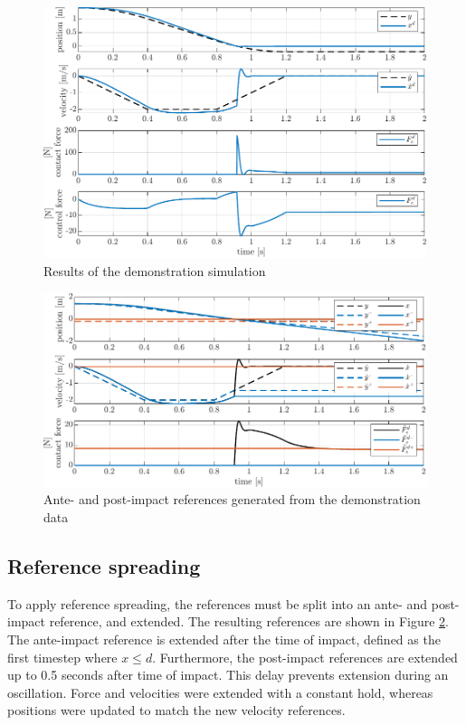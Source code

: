 \documentclass[11pt]{report}
\numberwithin{equation}{section}        %
\numberwithin{figure}{section}          %
\numberwithin{table}{section}           %
\begin{document}
  \begin{figure}[]
  \centering
  \begin{adjustwidth}{0pt}{5pt}
  \includegraphics[right]{Graphics/1d_demonstration.pdf}
  \end{adjustwidth}
  \caption{Results of the demonstration simulation}
  \label{fig:1d_demonstration}
  \end{figure}

  \begin{figure}[]
  \centering
  \begin{adjustwidth}{0pt}{5pt}
  \includegraphics[right]{Graphics/1d_RS.pdf}
  \end{adjustwidth}
  \caption{Ante- and post-impact references generated from the demonstration data}
  \label{fig:1d_RS}
  \end{figure}

  \subsection{Reference spreading}
  To apply reference spreading, the references must be split into an ante- and post-impact reference, and extended. The resulting references are shown in Figure \ref{fig:1d_RS}. The ante-impact reference is extended after the time of impact, defined as the first timestep where $x\leq d$. Furthermore, the post-impact references are extended up to 0.5 seconds after time of impact. This delay prevents extension during an oscillation. Force and velocities were extended with a constant hold, whereas positions were updated to match the new velocity references.
\end{document}
